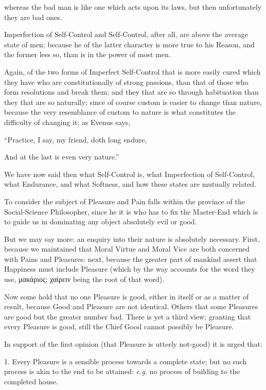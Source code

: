 whereas the bad man is like one which acts upon its laws, but then
unfortunately they are bad ones.

Imperfection of Self-Control and Self-Control, after all, are above the average
state of men; because he of the latter character is more true to his Reason,
and the former less so, than is in the power of most men.

Again, of the two forms of Imperfect Self-Control that is more easily cured
which they have who are constitutionally of strong passions, than that of those
who form resolutions and break them; and they that are so through habituation
than they that are so naturally; since of course custom is easier to change
than nature, because the very resemblance of custom to nature is what
constitutes the difficulty of changing it; as Evenus says,

“Practice, I say, my friend, doth long endure,

And at the last is even very nature.”

We have now said then what Self-Control is, what Imperfection of Self-Control,
what Endurance, and what Softness, and how these states are mutually related.


To consider the subject of Pleasure and Pain falls within the province of the
Social-Science Philosopher, since he it is who has to fix the Master-End which
is to guide us in dominating any object absolutely evil or good.

But we may say more: an enquiry into their nature is absolutely necessary.
First, because we maintained that Moral Virtue and Moral Vice are both
concerned with Pains and Pleasures: next, because the greater part of mankind
assert that Happiness must include Pleasure (which by the way accounts for the
word they use, μακάριος;
χαίρειν being the root of that word).

Now some hold that no one Pleasure is good, either in itself or as a matter of
result, because Good and Pleasure are not identical. Others that some Pleasures
are good but the greater number bad. There is yet a third view; granting that
every Pleasure is good, still the Chief Good cannot possibly be Pleasure.

In support of the first opinion (that Pleasure is utterly not-good) it is urged
that:

1. Every Pleasure is a sensible process towards a complete state; but no such
process is akin to the end to be attained: \emph{e.g.} no process of building
to the completed house.

